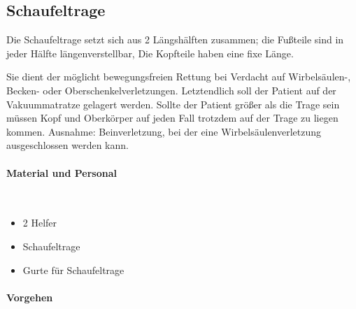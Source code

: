 \subsection{Schaufeltrage}
\label{topic:schaufeltrage-handhabung}

Die Schaufeltrage setzt sich aus 2 Längshälften zusammen;
die Fußteile sind in jeder Hälfte längenverstellbar,
Die Kopfteile haben eine fixe Länge.

Sie dient der möglicht bewegungsfreien Rettung bei Verdacht
auf Wirbelsäulen-, Becken- oder Oberschenkelverletzungen. Letztendlich soll der Patient
auf der Vakuummatratze gelagert werden. Sollte der Patient größer
als die Trage sein müssen Kopf und Oberkörper auf jeden Fall
trotzdem auf der Trage zu liegen kommen. Ausnahme: Beinverletzung, bei
der eine Wirbelsäulenverletzung ausgeschlossen werden kann.


\paragraph*{Material und Personal}~

\begin{itemize}
    \item 2 Helfer
    \item Schaufeltrage
    \item Gurte für Schaufeltrage
\end{itemize}

\paragraph*{Vorgehen}~

